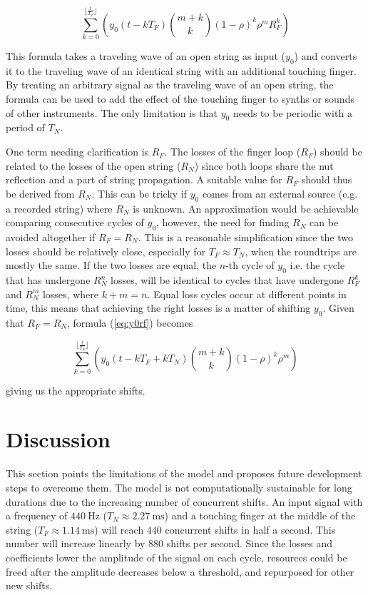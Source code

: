 \documentclass{sigchi}
\begin{document}
\begin{equation} \label{eq:y0rf}
	\sum_{k=0}^{\lfloor \frac{t}{T_F} \rfloor}\left(y_0(t - kT_F)\binom{m+k}{k} (1 - \rho)^{k} \rho^mR_F^k\right)
\end{equation}


This formula takes a traveling wave of an open string as input ($y_0$) and converts it to the traveling wave of an identical string with an additional touching finger. By treating an arbitrary signal as the traveling wave of an open string, the formula can be used to add the effect of the touching finger to synths or sounds of other instruments. The only limitation is that $y_0$ needs to be periodic with a period of $T_N$.

One term needing clarification is $R_F$. The losses of the finger loop ($R_F$) should be related to the losses of the open string ($R_N$) since both loops share the nut reflection and a part of string propagation. A suitable value for $R_F$ should thus be derived from $R_N$. This can be tricky if $y_0$ comes from an external source (e.g. a recorded string) where $R_N$ is unknown. An approximation would be achievable comparing consecutive cycles of $y_0$, however, the need for finding $R_N$ can be avoided altogether if $R_F = R_N$. This is a reasonable simplification since the two losses should be relatively close, especially for $T_F \approx T_N$, when the roundtrips are mostly the same. If the two losses are equal, the $n$-th cycle of $y_0$ i.e. the cycle that has undergone $R_N^n$ losses, will be identical to cycles that have undergone $R_F^k$ and $R_N^m$ losses, where $k+m=n$. Equal loss cycles occur at different points in time, this means that achieving the right losses is a matter of shifting $y_0$. Given that $R_F = R_N$, formula (\ref{eq:y0rf}) becomes

\begin{equation} \label{eq:y0}
	\sum_{k=0}^{\lfloor \frac{t}{T_F} \rfloor}\left(y_0(t - kT_F + kT_N)\binom{m+k}{k} (1 - \rho)^{k} \rho^m\right)
\end{equation}


giving us the appropriate shifts.

\section{Discussion}
This section points the limitations of the model and proposes future development steps to overcome them.
The model is not computationally sustainable for long durations due to the increasing number of concurrent shifts.
An input signal with a frequency of $\SI{440}{\hertz}$ ($T_N\approx\SI{2.27}{\milli\second}$) and a touching finger at the middle of the string ($T_F\approx\SI{1.14}{\milli\second}$) will reach $440$ concurrent shifts in half a second.
This number will increase linearly by $880$ shifts per second.
Since the losses and coefficients lower the amplitude of the signal on each cycle, resources could be freed after the amplitude decreases below a threshold, and repurposed for other new shifts.
\end{document}
